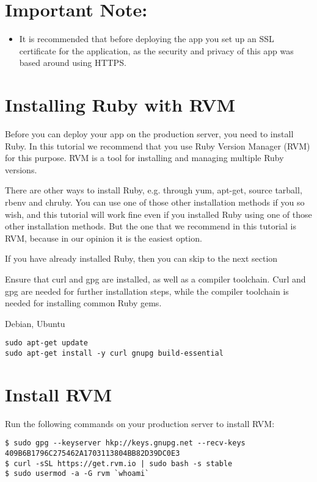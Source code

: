 \documentclass[11pt]{article}
\author{Justin}
\date{\today}
\title{}
\begin{document}
\tableofcontents

\section{Important Note:}
\label{sec:orgf161dbb}
\begin{itemize}
\item It is recommended that before deploying the app you set up an SSL certificate for the application, as the security and privacy of this app was based around using HTTPS.
\end{itemize}

\section{Installing Ruby with RVM}
\label{sec:orgdd8c804}
Before you can deploy your app on the production server, you need to install Ruby. In this tutorial we recommend that you use Ruby Version Manager (RVM) for this purpose. RVM is a tool for installing and managing multiple Ruby versions.

There are other ways to install Ruby, e.g. through yum, apt-get, source tarball, rbenv and chruby. You can use one of those other installation methods if you so wish, and this tutorial will work fine even if you installed Ruby using one of those other installation methods. But the one that we recommend in this tutorial is RVM, because in our opinion it is the easiest option.

If you have already installed Ruby, then you can skip to the next section

Ensure that curl and gpg are installed, as well as a compiler toolchain. Curl and gpg are needed for further installation steps, while the compiler toolchain is needed for installing common Ruby gems.

Debian, Ubuntu	
\begin{verbatim}
sudo apt-get update
sudo apt-get install -y curl gnupg build-essential
\end{verbatim}
\section{Install RVM}
\label{sec:orgd68fb0c}

Run the following commands on your production server to install RVM:

\begin{verbatim}
$ sudo gpg --keyserver hkp://keys.gnupg.net --recv-keys 409B6B1796C275462A1703113804BB82D39DC0E3
$ curl -sSL https://get.rvm.io | sudo bash -s stable
$ sudo usermod -a -G rvm `whoami`
\end{verbatim}
\end{document}
